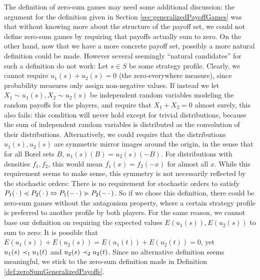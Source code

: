\documentclass[a4paper]{scrreprt}
\theoremstyle{definition}
\begin{document}
    The definition of zero-sum games may need some additional discussion: the argument for the definition given in Section \ref{sec:generalizedPayoffGames} was that without knowing more about the structure of the payoff set, we could not define zero-sum games by requiring that payoffs actually sum to zero.
    On the other hand, now that we have a more concrete payoff set, possibly a more natural definition could be made.    
    However several seemingly “natural candidates” for such a definition do not work: Let $s \in S$ be some strategy profile.
    Clearly, we cannot require $u_1(s) + u_2(s) = 0$ (the zero-everywhere measure), since probability measures only assign non-negative values.
    If instead we let $X_1 \sim u_1(s), X_2 \sim u_2(s)$ be independent random variables modeling the random payoffs for the players, and require that $X_1 + X_2 = 0$ almost surely, this also fails: this condition will never hold except for trivial distributions, because the sum of independent random variables is distributed as the convolution of their distributions.
    Alternatively, we could require that the distributions $u_1(s), u_2(s)$ are symmetric mirror images around the origin, in the sense that for all Borel sets $B$, $u_1(s)(B) = u_2(s)(-B)$. For distributions with densities $f_1, f_2$, this would mean $f_1(x) = f_2(-x)$ for almost all $x$.
    While this requirement seems to make sense, this symmetry is not necessarily reflected by the stochastic orders: There is no requirement for stochastic orders to satisfy $P_1(\,\cdot\,) \preccurlyeq P_2(\,\cdot\,) \Leftrightarrow P_1(-\,\cdot\,) \succcurlyeq P_2(-\,\cdot\,)$. So if we chose this definition, there could be zero-sum games without the antagonism property, where a certain strategy profile is preferred to another profile by both players.
    For the same reason, we cannot base our definition on requiring the expected values $E(u_1(s)), E(u_2(s))$ to sum to zero: It is possible that $E(u_1(s)) + E(u_2(s)) = E(u_1(t)) + E(u_2(t)) = 0$, yet $u_1(s) \dstrnonpref_1 u_1(t)$ and $u_2(s) \dstrnonpref_2 u_2(t)$.
    Since no alternative definition seems meaningful, we stick to the zero-sum definition made in Definition \ref{def:zeroSumGeneralizedPayoffs}.
\end{document}
